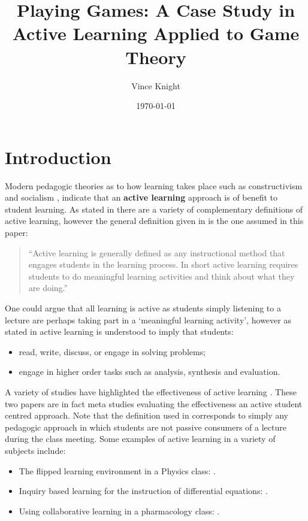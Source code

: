 \documentclass{article}
\title{Playing Games: A Case Study in Active Learning Applied to Game Theory}
\author{Vince Knight}
\date{\today}
\begin{document}
\maketitle


\section{Introduction}

Modern pedagogic theories as to how learning takes place such as constructivism
and socialism \cite{Illeris2009, Jordan2008a}, indicate that an \textbf{active
learning} approach is of benefit to student learning.  As stated in
\cite{Prince2004} there are a variety of complementary definitions of active
learning, however the general definition given in \cite{Prince2004} is the one
assumed in this paper:

\begin{quote}
``Active learning is generally defined as any instructional method that engages
students in the learning process. In short active learning requires students to
do meaningful learning activities and think about what they are doing.''
\end{quote}

One could argue that all learning is active as students simply listening to a
lecture are perhaps taking part in a `meaningful learning activity', however as
stated in \cite{Bonwell1991} active learning is understood to imply that
students:

\begin{itemize}
    \item read, write, discuss, or engage in solving problems;
    \item engage in higher order tasks such as analysis, synthesis and
        evaluation.
\end{itemize}

A variety of studies have highlighted the effectiveness of active learning
\cite{Freeman2014, Hake1998, Prince2004}. These two papers are in fact meta studies
evaluating the effectiveness an active student centred approach. Note that the
definition used in \cite{Freeman2014} corresponds to simply any pedagogic
approach in which students are not passive consumers of a lecture during the
class meeting. Some examples of active learning in a variety of subjects include:

\begin{itemize}
    \item The flipped learning environment in a Physics class: \cite{Bates}.
    \item Inquiry based learning for the instruction of differential equations:
        \cite{Kwon2005}.
    \item Using collaborative learning in a pharmacology class:
        \cite{Depaz2008}.
\end{itemize}
\end{document}
